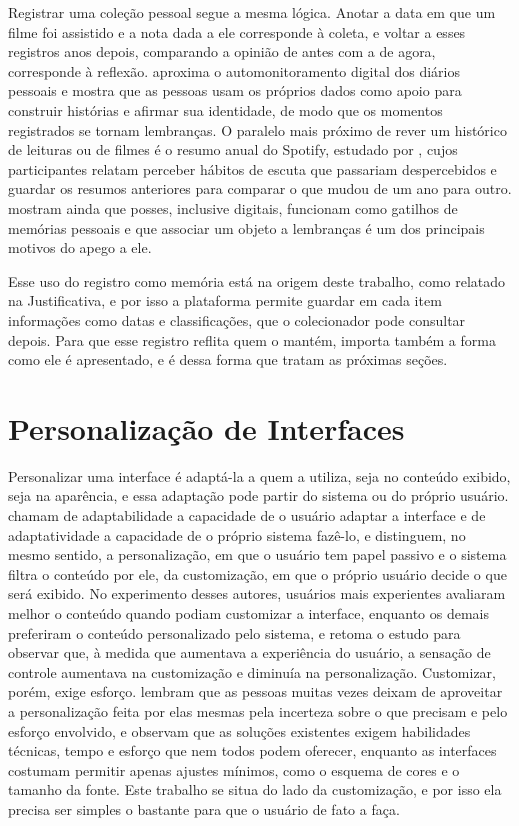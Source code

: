 Registrar uma coleção pessoal segue a mesma lógica. Anotar a data em que um filme foi assistido e a nota dada a ele corresponde à coleta, e voltar a esses
registros anos depois, comparando a opinião de antes com a de agora, corresponde à reflexão.  aproxima o automonitoramento digital
dos diários pessoais e mostra que as pessoas usam os próprios dados como apoio para construir histórias e afirmar sua identidade, de modo que os momentos
registrados se tornam lembranças. O paralelo mais próximo de rever um histórico de leituras ou de filmes é o resumo
anual do Spotify, estudado por , cujos participantes relatam perceber hábitos de escuta que passariam despercebidos e guardar os
resumos anteriores para comparar o que mudou de um ano para outro.  mostram ainda que posses, inclusive digitais, funcionam como
gatilhos de memórias pessoais e que associar um objeto a lembranças é um dos principais motivos do apego a ele.

Esse uso do registro como memória está na origem deste trabalho, como relatado na Justificativa, e por isso a plataforma permite guardar em cada item
informações como datas e classificações, que o colecionador pode consultar depois. Para que esse registro reflita quem o mantém, importa também a forma como
ele é apresentado, e é dessa forma que tratam as próximas seções.


\section{Personalização de Interfaces}
\label{sec:personalizacao}

Personalizar uma interface é adaptá-la a quem a utiliza, seja no conteúdo exibido, seja na aparência, e essa adaptação pode partir do sistema ou do próprio
usuário.  chamam de adaptabilidade a capacidade de o usuário adaptar a interface e de adaptatividade a capacidade de o próprio sistema
fazê-lo, e  distinguem, no mesmo sentido, a personalização, em que o usuário tem papel passivo e o sistema filtra o conteúdo por
ele, da customização, em que o próprio usuário decide o que será exibido. No experimento desses autores, usuários mais experientes avaliaram melhor o conteúdo
quando podiam customizar a interface, enquanto os demais preferiram o conteúdo personalizado pelo sistema, e  retoma o estudo para
observar que, à medida que aumentava a experiência do usuário, a sensação de controle aumentava na customização e diminuía na personalização. Customizar, porém,
exige esforço.  lembram que as pessoas muitas vezes deixam de aproveitar a personalização feita por elas mesmas pela incerteza sobre o que
precisam e pelo esforço envolvido, e  observam que as soluções existentes exigem habilidades técnicas, tempo e esforço que nem
todos podem oferecer, enquanto as interfaces costumam permitir apenas ajustes mínimos, como o esquema de cores e o tamanho da fonte. Este trabalho se situa do
lado da customização, e por isso ela precisa ser simples o bastante para que o usuário de fato a faça.

